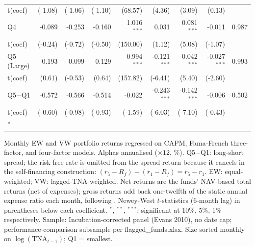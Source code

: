 {\begin{longtable}[t]{lrrrrrrrr}
\hspace{1em}t(coef) & (-1.08) & (-1.06) & (-1.10) & (68.57) & (4.36) & (3.09) & (0.13) & \\
\hspace{1em}Q4 & -0.089 & -0.253 & -0.160 & 1.016$^{***}$ & 0.031 & 0.081$^{***}$ & -0.011 & 0.987\\
\hspace{1em}t(coef) & (-0.24) & (-0.72) & (-0.50) & (150.00) & (1.12) & (5.08) & (-1.07) & \\
\hspace{1em}Q5 (Large) & 0.193 & -0.099 & 0.129 & 0.994$^{***}$ & -0.121$^{***}$ & 0.042$^{***}$ & -0.027$^{***}$ & 0.993\\
\hspace{1em}t(coef) & (0.61) & (-0.53) & (0.64) & (157.82) & (-6.41) & (5.40) & (-2.60) & \\
\hspace{1em}Q5$-$Q1 & -0.572 & -0.566 & -0.514 & -0.022 & -0.243$^{***}$ & -0.142$^{***}$ & -0.006 & 0.502\\
\hspace{1em}t(coef) & (-0.60) & (-0.98) & (-0.93) & (-1.59) & (-6.03) & (-7.10) & (-0.43) & \\*
\end{longtable}
}
\begin{singlespace}\footnotesize\noindent
Monthly EW and VW portfolio returns regressed on CAPM, Fama-French three-factor, and \textcite{Carhart1997} four-factor models. Alphas annualised ($\times 12$, \%). Q5$-$Q1: long-short spread; the risk-free rate is omitted from the spread return because it cancels in the self-financing construction: $(r_5 - R_f) - (r_1 - R_f) = r_5 - r_1$. EW: equal-weighted; VW: lagged-TNA-weighted. Net returns are the funds' NAV-based total returns (net of expenses); gross returns add back one-twelfth of the static annual expense ratio each month, following \textcite{FamaFrench2010}. Newey-West $t$-statistics (6-month lag) in parentheses below each coefficient. $^{*}$, $^{**}$, $^{***}$: significant at 10\%, 5\%, 1\% respectively. Sample: Incubation-corrected panel (Evans 2010), no date cap; performance-comparison subsample per flagged\_funds.xlsx. Size sorted monthly on $\log(\text{TNA}_{t-1})$; Q1 = smallest.
\end{singlespace}\par\vspace{24pt}


